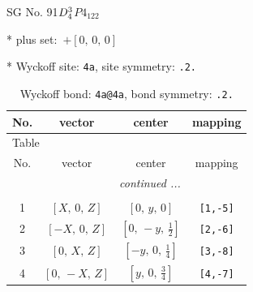 \documentclass[fleqn,8pt]{jsarticle}
\begin{document}
\setcounter{MaxMatrixCols}{32}

\renewcommand{\tablename}{Table~}
\renewcommand{\figurename}{Figure~}
\begin{center}
\LARGE
SG No. 91\quad$D_{\rm 4}^{3}$\quad$P4_122$\quad[ tetragonal ]
\end{center}

* plus set:\,\,\,$+\left[ 0,\, 0,\, 0 \right]$


* Wyckoff site: {\tt 4a}, site symmetry: {\tt .2.}
\renewcommand{\arraystretch}{1.2}
\begin{longtable}{cccc}
\caption{Wyckoff bond: {\tt 4a@4a}, bond symmetry: {\tt .2.}}
 \\
 \hline \hline
No. & vector & center & mapping \\ \hline \endfirsthead

\multicolumn{3}{l}{\tablename\ \thetable{}} \\
 \hline \hline
No. & vector & center & mapping \\ \hline \endhead

 \hline \hline
\multicolumn{3}{r}{\footnotesize\it continued ...} \\ \endfoot

 \hline \hline
\multicolumn{3}{r}{} \\ \endlastfoot

1 & $\left[ X,\, 0,\, Z \right]$ & $\left[ 0,\, y,\, 0 \right]$ & {\tt [1,-5]} \\ \hline
2 & $\left[ - X,\, 0,\, Z \right]$ & $\left[ 0,\, - y,\, \frac{1}{2} \right]$ & {\tt [2,-6]} \\ \hline
3 & $\left[ 0,\, X,\, Z \right]$ & $\left[ - y,\, 0,\, \frac{1}{4} \right]$ & {\tt [3,-8]} \\ \hline
4 & $\left[ 0,\, - X,\, Z \right]$ & $\left[ y,\, 0,\, \frac{3}{4} \right]$ & {\tt [4,-7]} \\
\end{longtable}
\renewcommand{\arraystretch}{1.2}
\end{document}

